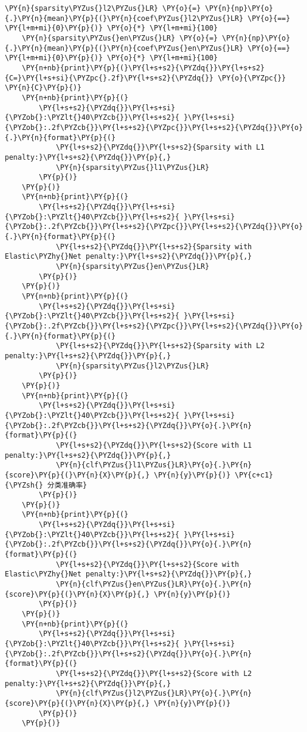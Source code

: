 \begin{Verbatim}[commandchars=\\\{\}]
    \PY{n}{sparsity\PYZus{}l2\PYZus{}LR} \PY{o}{=} \PY{n}{np}\PY{o}{.}\PY{n}{mean}\PY{p}{(}\PY{n}{coef\PYZus{}l2\PYZus{}LR} \PY{o}{==} \PY{l+m+mi}{0}\PY{p}{)} \PY{o}{*} \PY{l+m+mi}{100}
    \PY{n}{sparsity\PYZus{}en\PYZus{}LR} \PY{o}{=} \PY{n}{np}\PY{o}{.}\PY{n}{mean}\PY{p}{(}\PY{n}{coef\PYZus{}en\PYZus{}LR} \PY{o}{==} \PY{l+m+mi}{0}\PY{p}{)} \PY{o}{*} \PY{l+m+mi}{100}
    \PY{n+nb}{print}\PY{p}{(}\PY{l+s+s2}{\PYZdq{}}\PY{l+s+s2}{C=}\PY{l+s+si}{\PYZpc{}.2f}\PY{l+s+s2}{\PYZdq{}} \PY{o}{\PYZpc{}} \PY{n}{C}\PY{p}{)}
    \PY{n+nb}{print}\PY{p}{(}
        \PY{l+s+s2}{\PYZdq{}}\PY{l+s+si}{\PYZob{}:\PYZlt{}40\PYZcb{}}\PY{l+s+s2}{ }\PY{l+s+si}{\PYZob{}:.2f\PYZcb{}}\PY{l+s+s2}{\PYZpc{}}\PY{l+s+s2}{\PYZdq{}}\PY{o}{.}\PY{n}{format}\PY{p}{(}
            \PY{l+s+s2}{\PYZdq{}}\PY{l+s+s2}{Sparsity with L1 penalty:}\PY{l+s+s2}{\PYZdq{}}\PY{p}{,} 
            \PY{n}{sparsity\PYZus{}l1\PYZus{}LR}
        \PY{p}{)}
    \PY{p}{)}
    \PY{n+nb}{print}\PY{p}{(}
        \PY{l+s+s2}{\PYZdq{}}\PY{l+s+si}{\PYZob{}:\PYZlt{}40\PYZcb{}}\PY{l+s+s2}{ }\PY{l+s+si}{\PYZob{}:.2f\PYZcb{}}\PY{l+s+s2}{\PYZpc{}}\PY{l+s+s2}{\PYZdq{}}\PY{o}{.}\PY{n}{format}\PY{p}{(}
            \PY{l+s+s2}{\PYZdq{}}\PY{l+s+s2}{Sparsity with Elastic\PYZhy{}Net penalty:}\PY{l+s+s2}{\PYZdq{}}\PY{p}{,} 
            \PY{n}{sparsity\PYZus{}en\PYZus{}LR}
        \PY{p}{)}
    \PY{p}{)}
    \PY{n+nb}{print}\PY{p}{(}
        \PY{l+s+s2}{\PYZdq{}}\PY{l+s+si}{\PYZob{}:\PYZlt{}40\PYZcb{}}\PY{l+s+s2}{ }\PY{l+s+si}{\PYZob{}:.2f\PYZcb{}}\PY{l+s+s2}{\PYZpc{}}\PY{l+s+s2}{\PYZdq{}}\PY{o}{.}\PY{n}{format}\PY{p}{(}
            \PY{l+s+s2}{\PYZdq{}}\PY{l+s+s2}{Sparsity with L2 penalty:}\PY{l+s+s2}{\PYZdq{}}\PY{p}{,} 
            \PY{n}{sparsity\PYZus{}l2\PYZus{}LR}
        \PY{p}{)}
    \PY{p}{)}
    \PY{n+nb}{print}\PY{p}{(}
        \PY{l+s+s2}{\PYZdq{}}\PY{l+s+si}{\PYZob{}:\PYZlt{}40\PYZcb{}}\PY{l+s+s2}{ }\PY{l+s+si}{\PYZob{}:.2f\PYZcb{}}\PY{l+s+s2}{\PYZdq{}}\PY{o}{.}\PY{n}{format}\PY{p}{(}
            \PY{l+s+s2}{\PYZdq{}}\PY{l+s+s2}{Score with L1 penalty:}\PY{l+s+s2}{\PYZdq{}}\PY{p}{,} 
            \PY{n}{clf\PYZus{}l1\PYZus{}LR}\PY{o}{.}\PY{n}{score}\PY{p}{(}\PY{n}{X}\PY{p}{,} \PY{n}{y}\PY{p}{)} \PY{c+c1}{\PYZsh{} 分类准确率}
        \PY{p}{)}
    \PY{p}{)}
    \PY{n+nb}{print}\PY{p}{(}
        \PY{l+s+s2}{\PYZdq{}}\PY{l+s+si}{\PYZob{}:\PYZlt{}40\PYZcb{}}\PY{l+s+s2}{ }\PY{l+s+si}{\PYZob{}:.2f\PYZcb{}}\PY{l+s+s2}{\PYZdq{}}\PY{o}{.}\PY{n}{format}\PY{p}{(}
            \PY{l+s+s2}{\PYZdq{}}\PY{l+s+s2}{Score with Elastic\PYZhy{}Net penalty:}\PY{l+s+s2}{\PYZdq{}}\PY{p}{,} 
            \PY{n}{clf\PYZus{}en\PYZus{}LR}\PY{o}{.}\PY{n}{score}\PY{p}{(}\PY{n}{X}\PY{p}{,} \PY{n}{y}\PY{p}{)}
        \PY{p}{)}
    \PY{p}{)}
    \PY{n+nb}{print}\PY{p}{(}
        \PY{l+s+s2}{\PYZdq{}}\PY{l+s+si}{\PYZob{}:\PYZlt{}40\PYZcb{}}\PY{l+s+s2}{ }\PY{l+s+si}{\PYZob{}:.2f\PYZcb{}}\PY{l+s+s2}{\PYZdq{}}\PY{o}{.}\PY{n}{format}\PY{p}{(}
            \PY{l+s+s2}{\PYZdq{}}\PY{l+s+s2}{Score with L2 penalty:}\PY{l+s+s2}{\PYZdq{}}\PY{p}{,} 
            \PY{n}{clf\PYZus{}l2\PYZus{}LR}\PY{o}{.}\PY{n}{score}\PY{p}{(}\PY{n}{X}\PY{p}{,} \PY{n}{y}\PY{p}{)}
        \PY{p}{)}
    \PY{p}{)}


\end{Verbatim}
